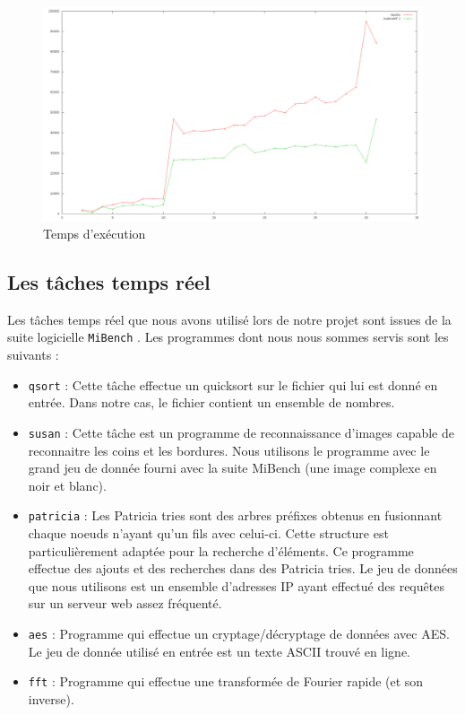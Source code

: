 \begin{figure}[H]
\centering
\includegraphics[scale=0.285]{include/speedup.png}
\caption{Temps d'exécution}
\label{fig:speedup}
\end{figure}

\subsection{Les tâches temps réel}

Les tâches temps réel que nous avons utilisé lors de notre projet sont issues 
de la suite logicielle \texttt{MiBench} \cite{guthaus_mibench:_2001}. Les 
programmes dont nous nous sommes servis sont les suivants : 

\begin{itemize}
\renewcommand{\labelitemi}{$\bullet$}
\item \texttt{qsort} : Cette tâche effectue un quicksort sur le fichier qui lui 
est donné en entrée. Dans notre cas, le fichier contient un ensemble de nombres.
\item \texttt{susan} : Cette tâche est un programme de reconnaissance d'images 
capable de reconnaitre les coins et les bordures. Nous utilisons le programme 
avec le grand jeu de donnée fourni avec la suite MiBench (une image complexe 
en noir et blanc).
\item \texttt{patricia} : Les Patricia tries sont des arbres préfixes obtenus 
en fusionnant chaque noeuds n'ayant qu'un fils avec celui-ci. Cette structure 
est particulièrement adaptée pour la recherche d'éléments. Ce programme effectue
des ajouts et des recherches dans des Patricia tries. Le jeu de données que
nous utilisons est un ensemble d'adresses IP ayant effectué des requêtes sur un
serveur web assez fréquenté.
\item \texttt{aes} : Programme qui effectue un cryptage/décryptage de données 
avec AES. Le jeu de donnée utilisé en entrée est un texte ASCII trouvé en ligne.
\item \texttt{fft} : Programme qui effectue une transformée de Fourier rapide (et 
son inverse). 
\end{itemize}
